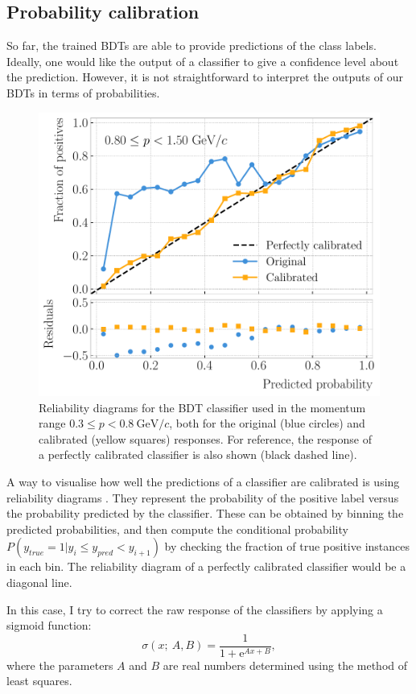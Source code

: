 \subsection{Probability calibration}

So far, the trained BDTs are able to provide predictions of the class labels. Ideally, one would like the output of a classifier to give a confidence level about the prediction. However, it is not straightforward to interpret the outputs of our BDTs in terms of probabilities.

\begin{figure}[t]
	\centering
	\includegraphics[width=.75\linewidth]{Images/GArSoft_PID/BDT/ecal_bdt_output_example_calibration_curves.pdf}
	\caption{Reliability diagrams for the BDT classifier used in the momentum range $0.3 \leq p < 0.8 ~ \mathrm{GeV}/c$, both for the original (blue circles) and calibrated (yellow squares) responses. For reference, the response of a perfectly calibrated classifier is also shown (black dashed line).}
	\label{fig:bdt_calibration_curves}
\end{figure}

A way to visualise how well the predictions of a classifier are calibrated is using reliability diagrams \cite{Wilks1995}. They represent the probability of the positive label versus the probability predicted by the classifier. These can be obtained by binning the predicted probabilities, and then compute the conditional probability $P(y_{true}=1|y_{i} \leq y_{pred} < y_{i+1})$ by checking the fraction of true positive instances in each bin. The reliability diagram of a perfectly calibrated classifier would be a diagonal line.

In this case, I try to correct the raw response of the classifiers by applying a sigmoid function:
\begin{equation}
	\sigma(x;~A,B) = \frac{1}{1+\mathrm{e}^{Ax+B}},
\end{equation}
where the parameters $A$ and $B$ are real numbers determined using the method of least squares.


